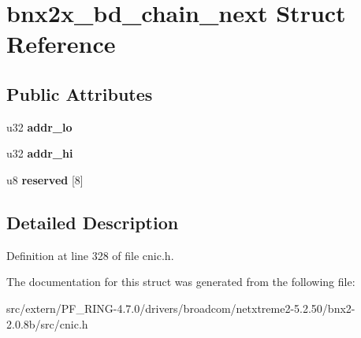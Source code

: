 \hypertarget{structbnx2x__bd__chain__next}{
\section{bnx2x\_\-bd\_\-chain\_\-next Struct Reference}
\label{structbnx2x__bd__chain__next}
}
\subsection*{Public Attributes}
\begin{DoxyCompactItemize}
\item 
\hypertarget{structbnx2x__bd__chain__next_a273ee56788d738736a3f181f0e411c54}{
u32 {\bfseries addr\_\-lo}}
\label{structbnx2x__bd__chain__next_a273ee56788d738736a3f181f0e411c54}

\item 
\hypertarget{structbnx2x__bd__chain__next_ab3891d07096d27aad5fc760d406c1e26}{
u32 {\bfseries addr\_\-hi}}
\label{structbnx2x__bd__chain__next_ab3891d07096d27aad5fc760d406c1e26}

\item 
\hypertarget{structbnx2x__bd__chain__next_a704b260610cdcc8bbc55c3c1c7530b6a}{
u8 {\bfseries reserved} \mbox{[}8\mbox{]}}
\label{structbnx2x__bd__chain__next_a704b260610cdcc8bbc55c3c1c7530b6a}

\end{DoxyCompactItemize}


\subsection{Detailed Description}


Definition at line 328 of file cnic.h.



The documentation for this struct was generated from the following file:\begin{DoxyCompactItemize}
\item 
src/extern/PF\_\-RING-\/4.7.0/drivers/broadcom/netxtreme2-\/5.2.50/bnx2-\/2.0.8b/src/cnic.h\end{DoxyCompactItemize}
